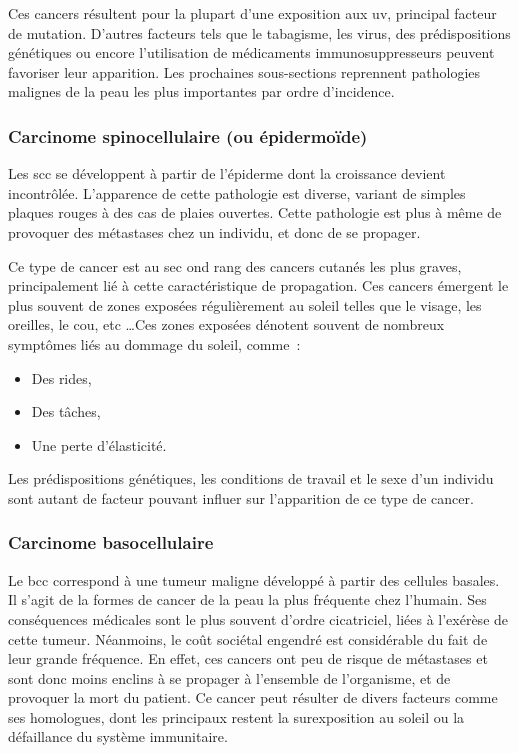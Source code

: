 Ces cancers résultent pour la plupart d’une exposition aux \gls{uv}, principal facteur de mutation. D’autres facteurs tels que le tabagisme, les virus, des prédispositions génétiques ou encore l’utilisation de médicaments immunosuppresseurs peuvent favoriser leur apparition. Les prochaines sous-sections reprennent pathologies malignes de la peau les plus importantes par ordre d'incidence.\par

\subsubsection{Carcinome spinocellulaire (ou épidermoïde)}
Les \gls{scc} se développent à partir de l'épiderme dont la croissance devient incontrôlée. L’apparence de cette pathologie est diverse, variant de simples plaques rouges à des cas de plaies ouvertes. Cette pathologie est plus à même de provoquer des métastases chez un individu, et donc de se propager.\par

Ce type de cancer est au sec ond rang des cancers cutanés les plus graves, principalement lié à cette caractéristique de propagation. Ces cancers émergent le plus souvent de zones exposées régulièrement au soleil telles que le visage, les oreilles, le cou, etc \ldots Ces zones exposées dénotent souvent de nombreux symptômes liés au dommage du soleil, comme~:
\begin{itemize}
\item Des rides,
\item Des tâches,
\item Une perte d’élasticité.
\end{itemize}
Les prédispositions génétiques, les conditions de travail et le sexe d’un individu sont autant de facteur pouvant influer sur l’apparition de ce type de cancer.\par

\subsubsection{Carcinome basocellulaire}	
Le \gls{bcc} correspond à une tumeur maligne développé à partir des cellules basales. Il s’agit de la formes de cancer de la peau la plus fréquente chez l'humain. Ses conséquences médicales sont le plus souvent d'ordre cicatriciel, liées à l'exérèse de cette tumeur. Néanmoins, le coût sociétal engendré est considérable du fait de leur grande fréquence. En effet, ces cancers ont peu de risque de métastases et sont donc moins enclins à se propager à l’ensemble de l’organisme, et de provoquer la mort du patient. Ce cancer peut résulter de divers facteurs comme ses homologues, dont les principaux restent la surexposition au soleil ou la défaillance du système immunitaire.\par

